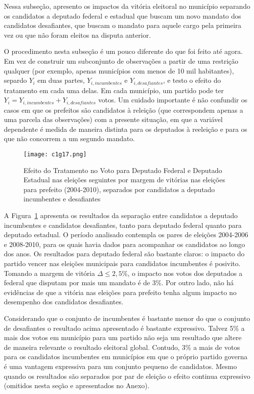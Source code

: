 Nessa subseção, apresento os impactos da vitória eleitoral no município separando os candidatos a deputado federal e estadual que buscam um novo mandato dos candidatos desafiantes, que buscam o mandato para aquele cargo pela primeira vez ou que não foram eleitos na disputa anterior.

O procedimento nesta subseção é um pouco diferente do que foi feito até agora. Em vez de construir um subconjunto de observações a partir de uma restrição qualquer (por exemplo, apenas municípios com menos de 10 mil habitantes), separdo $Y_{i}$ em duas partes, $Y_{i,incumbentes}$ e $Y_{i,desafiantes}$, e testo o efeito do tratamento em cada uma delas. Em cada município, um partido pode ter $Y_{i} = Y_{i,incumbentes}+Y_{i,desafiantes}$ votos. Um cuidado importante é não confundir os casos em que os prefeitos são candidatos à releição (que correspondem apenas a uma parcela das observações) com a presente situação, em que a variável dependente é medida de maneira distinta para os deputados à reeleição e para os que não concorrem a um segundo mandato.

\begin{figure}[htp]
	\centering
	\texttt{[image: c1g17.png]}
	\caption{Efeito do Tratamento no Voto para Deputado Federal e Deputado Estadual nas eleições seguintes por margem de vitórias nas eleições para prefeito (2004-2010), separados por candidatos a deputado incumbentes e desafiantes}
	\label{fig:c1g17} 
\end{figure}

A Figura~\ref{fig:c1g17} apresenta os resultados da separação entre candidatos a deputado incumbentes e candidatos desafiantes, tanto para deputado federal quanto para deputado estadual. O período analisado contempla os pares de eleições 2004-2006 e 2008-2010, para os quais havia dados para acompanhar os candidatos ao longo dos anos. Os resultados para deputado federal são bastante claros: o impacto do partido vencer nas eleições municipais para candidatos incumbentes é posivito. Tomando a margem de vitória $\Delta \leq 2,5\%$, o impacto nos votos dos deputados a federal que disputam por mais um mandato é de 3\%. Por outro lado, não há evidências de que a vitória nas eleições para prefeito tenha algum impacto no desempenho dos candidatos desafiantes. 

Considerando que o conjunto de incumbentes é bastante menor do que o conjunto de desafiantes o resultado acima apresentado é bastante expressivo. Talvez 5\% a mais dos votos em município para um partido não seja um resultado que altere de maneira relevante o resultado eleitoral global. Contudo, 3\% a mais de votos para os candidatos incumbentes em municípios em que o próprio partido governa é uma vantagem expressiva para um conjunto pequeno de candidatos. Mesmo quando os resultados são separados por par de eleição o efeito continua expressivo (omitidos nesta seção e apresentados no Anexo).

